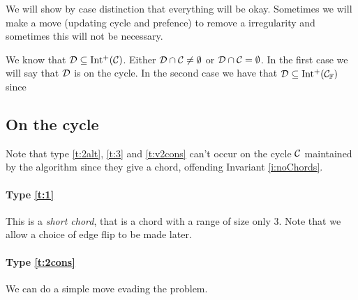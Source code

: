 We will show by case distinction that everything will be okay. Sometimes we will make a move (updating cycle and prefence) to remove a irregularity and sometimes this will not be necessary.



We know that $\mathcal{D} \subseteq \operatorname{Int^{+}}(\mathcal{C})$. Either $\mathcal{D} \cap \mathcal{C} \neq \emptyset$ or
$\mathcal{D} \cap \mathcal{C} = \emptyset$. In the first case we will say that $\mathcal{D}$ is on the cycle.
In the second case we have that $\mathcal{D} \subseteq \operatorname{Int^{+}}(\mathcal{C}_{\mathbb{F}})$ since


\subsection{On the cycle}
  Note that type \ref{t:2alt}, \ref{t:3} and \ref{t:v2cons} can't occur on the cycle $\mathcal{C}$ maintained by the algorithm since they give a chord, offending Invariant \ref{i:noChords}.

  \paragraph{Type \ref{t:1}}
  This is a \emph{short chord}, that is a chord with a range of size only 3. Note that we allow a choice of edge flip to be made later.

  \paragraph{Type \ref{t:2cons}}
  We can do a simple move evading the problem.

